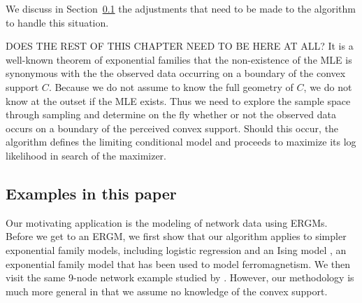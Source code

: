 We discuss in Section~\ref{} the adjustments that need to be made to the algorithm
to handle this situation.

DOES THE REST OF THIS CHAPTER NEED TO BE HERE AT ALL?  It is a well-known theorem of exponential families that the non-existence of the MLE 
is synonymous with the the observed data occurring on a boundary of the 
convex support $C$.
Because we do not assume to know the full geometry of $C$, we do not know at the 
outset if the MLE exists.  
Thus we need to explore the sample space through sampling and determine on the fly 
whether or not the observed data occurs on a boundary of the perceived 
convex support.  
Should this occur, the algorithm defines the limiting conditional model and 
proceeds to maximize its log likelihood in search of the maximizer.

\subsection{Examples in this paper}


Our motivating application is the modeling of network data using ERGMs.
Before we get to an ERGM, we first show that our algorithm applies to simpler
exponential family models, including logistic regression and an Ising model \citep{Ising,Potts}, an exponential family model that has been used to model 
ferromagnetism.
We then visit the same 9-node network example studied by \citep{Rinaldo:2009}.  
However, our methodology is much more general in that we assume no knowledge of the 
convex support.
